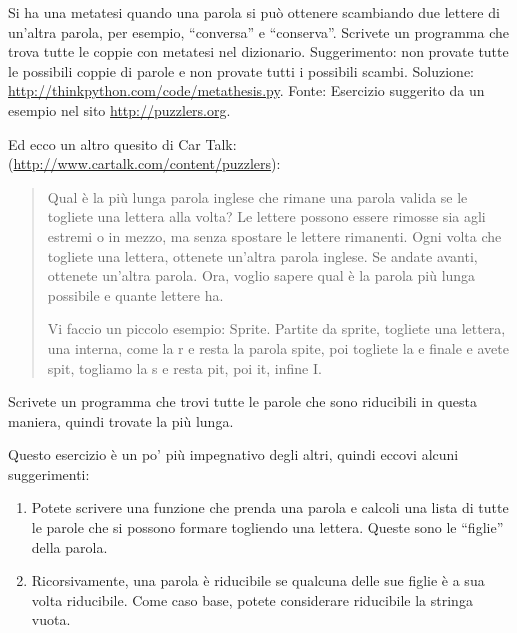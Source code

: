 \documentclass[10pt]{book}
\begin{document}
\vspace{0.2in}
\begin{exercise}

Si ha una metatesi quando una parola si può ottenere scambiando due lettere di un'altra parola, per esempio, ``conversa'' e ``conserva''.  Scrivete un programma che trova tutte le coppie con metatesi nel dizionario. Suggerimento: non provate tutte le possibili coppie di parole e non provate tutti i possibili scambi. Soluzione: \url{http://thinkpython.com/code/metathesis.py}.
Fonte: Esercizio suggerito da un esempio nel sito \url{http://puzzlers.org}.

\end{exercise}


\vspace{0.2in}
\begin{exercise}

Ed ecco un altro quesito di Car Talk:
(\url{http://www.cartalk.com/content/puzzlers}):

\begin{quote}
Qual è la più lunga parola inglese che rimane una parola valida se le togliete una lettera alla volta? 
Le lettere possono essere rimosse sia agli estremi o in mezzo, ma senza spostare le lettere rimanenti. Ogni volta che togliete una lettera, ottenete un'altra parola inglese. Se andate avanti, ottenete un'altra parola. Ora, voglio sapere qual è la parola più lunga possibile e quante lettere ha.

Vi faccio un piccolo esempio: Sprite. Partite da sprite, togliete una lettera, una interna, come la r e resta la parola spite, poi togliete la e finale e avete spit, togliamo la s e resta pit, poi it, infine I.
\end{quote}

Scrivete un programma che trovi tutte le parole che sono riducibili in questa maniera, quindi trovate la più lunga.

Questo esercizio è un po' più impegnativo degli altri, quindi eccovi alcuni suggerimenti:

\begin{enumerate}

\item Potete scrivere una funzione che prenda una parola e calcoli una lista di tutte le parole che si possono formare togliendo una lettera. Queste sono le ``figlie'' della parola.

\item Ricorsivamente, una parola è riducibile se qualcuna delle sue figlie è a sua volta riducibile. Come caso base, potete considerare riducibile la stringa vuota.


\end{enumerate}
\end{exercise}
\end{document}
